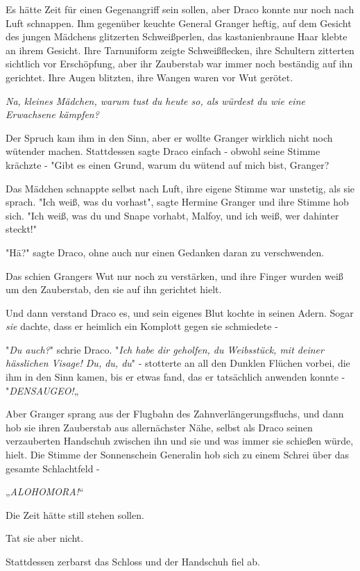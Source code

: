 {Es hätte Zeit für einen Gegenangriff sein sollen, aber Draco konnte nur noch nach Luft schnappen. Ihm gegenüber keuchte General Granger heftig, auf dem Gesicht des jungen Mädchens glitzerten Schweißperlen, das kastanienbraune Haar klebte an ihrem Gesicht. Ihre Tarnuniform zeigte Schweißflecken, ihre Schultern zitterten sichtlich vor Erschöpfung, aber ihr Zauberstab war immer noch beständig auf ihn gerichtet. Ihre Augen blitzten, ihre Wangen waren vor Wut gerötet.

\emph{Na, kleines Mädchen, warum tust du heute so, als würdest du wie eine Erwachsene kämpfen?}

Der Spruch kam ihm in den Sinn, aber er wollte Granger wirklich nicht noch wütender machen. Stattdessen sagte Draco einfach - obwohl seine Stimme krächzte - "Gibt es einen Grund, warum du wütend auf mich bist, Granger?

Das Mädchen schnappte selbst nach Luft, ihre eigene Stimme war unstetig, als sie sprach. "Ich weiß, was du vorhast", sagte Hermine Granger und ihre Stimme hob sich. "Ich weiß, was du und Snape vorhabt, Malfoy, und ich weiß, wer dahinter steckt!"

"Hä?" sagte Draco, ohne auch nur einen Gedanken daran zu verschwenden.

Das schien Grangers Wut nur noch zu verstärken, und ihre Finger wurden weiß um den Zauberstab, den sie auf ihn gerichtet hielt.

Und dann verstand Draco es, und sein eigenes Blut kochte in seinen Adern. Sogar \emph{sie} dachte, dass er heimlich ein Komplott gegen sie schmiedete -

"\emph{Du auch?}" schrie Draco. "\emph{Ich habe dir geholfen, du Weibsstück, mit deiner hässlichen Visage! Du, du, du}" - stotterte an all den Dunklen Flüchen vorbei, die ihm in den Sinn kamen, bis er etwas fand, das er tatsächlich anwenden konnte - "\emph{DENSAUGEO!}„

Aber Granger sprang aus der Flugbahn des Zahnverlängerungsfluchs, und dann hob sie ihren Zauberstab aus allernächster Nähe, selbst als Draco seinen verzauberten Handschuh zwischen ihn und sie und was immer sie schießen würde, hielt. Die Stimme der Sonnenschein Generalin hob sich zu einem Schrei über das gesamte Schlachtfeld -

„\emph{ALOHOMORA!}“

Die Zeit hätte still stehen sollen.

Tat sie aber nicht.

Stattdessen zerbarst das Schloss und der Handschuh fiel ab.

}
